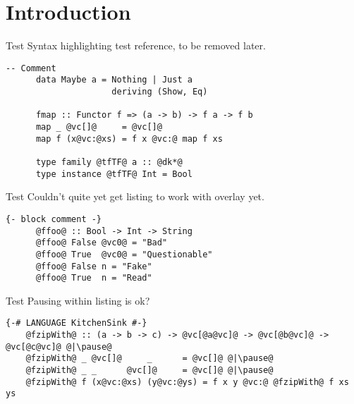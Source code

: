 \documentclass[xcolor={usenames,dvipsnames}]{beamer}
\begin{document}
\section{Introduction}

\begin{frame}[fragile]{Test}
  Syntax highlighting test reference, to be removed later.

  \begin{lstlisting}[style=hask]
      -- Comment
      data Maybe a = Nothing | Just a
                     deriving (Show, Eq)
 
      fmap :: Functor f => (a -> b) -> f a -> f b
      map _ @vc[]@     = @vc[]@
      map f (x@vc:@xs) = f x @vc:@ map f xs
 
      type family @tfTF@ a :: @dk*@
      type instance @tfTF@ Int = Bool
  \end{lstlisting}
\end{frame}

\begin{frame}[fragile]{Test}
  Couldn't quite yet get listing to work with overlay yet.

  \begin{lstlisting}[style=hask]
      {- block comment -}
      @ffoo@ :: Bool -> Int -> String
      @ffoo@ False @vc0@ = "Bad"
      @ffoo@ True  @vc0@ = "Questionable"
      @ffoo@ False n = "Fake"
      @ffoo@ True  n = "Read"
  \end{lstlisting}
\end{frame}

\begin{frame}[fragile]{Test}
  Pausing within listing is ok?

  \begin{lstlisting}[style=hask]
    {-# LANGUAGE KitchenSink #-}
    @fzipWith@ :: (a -> b -> c) -> @vc[@a@vc]@ -> @vc[@b@vc]@ -> @vc[@c@vc]@ @|\pause@
    @fzipWith@ _ @vc[]@     _      = @vc[]@ @|\pause@
    @fzipWith@ _ _      @vc[]@     = @vc[]@ @|\pause@
    @fzipWith@ f (x@vc:@xs) (y@vc:@ys) = f x y @vc:@ @fzipWith@ f xs ys
  \end{lstlisting}
\end{frame}
\end{document}
